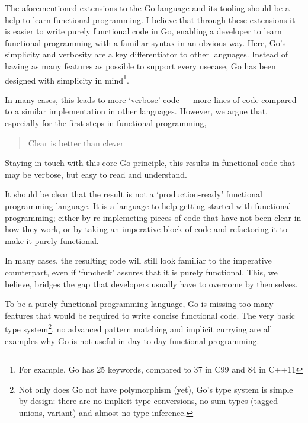 
The aforementioned extensions to the Go language and its tooling should be a help to learn
functional programming. I believe that through these extensions it is easier to write
purely functional code in Go, enabling a developer to learn functional programming with
a familiar syntax in an obvious way. Here, Go's simplicity and verbosity are a key differentiator
to other languages. Instead of having as many features as possible to support every usecase,
Go has been designed with simplicity in mind\footnote{For example, Go has 25 keywords, compared
to 37 in C99 and 84 in C++11}.

In many cases, this leads to more `verbose' code --- more lines of code compared to a similar
implementation in other languages. However, we argue that, especially for the first steps
in functional programming,

\begin{quote}
Clear is better than clever\autocite{cheney-clear}
\end{quote}

Staying in touch with this core Go principle, this results in functional code that may be
verbose, but easy to read and understand.

It should be clear that the result is not a `production-ready' functional programming language.
It is a language to help getting started with functional programming; either by re-implemeting pieces
of code that have not been clear in how they work, or by taking an imperative block of code
and refactoring it to make it purely functional.

In many cases, the resulting code will still look familiar to the imperative counterpart,
even if `funcheck' assures that it is purely functional. This, we believe, bridges the gap
that developers usually have to overcome by themselves.

To be a purely functional programming language, Go is missing too many features that would be
required to write concise functional code. The very basic type system\footnote{Not only
	does Go not have polymorphism (yet), Go's type system is simple by design: there are no
	implicit type conversions, no sum types (tagged unions, variant) and almost no type inference.
}, no advanced pattern matching and implicit currying are all examples why Go is not useful
in day-to-day functional programming.

